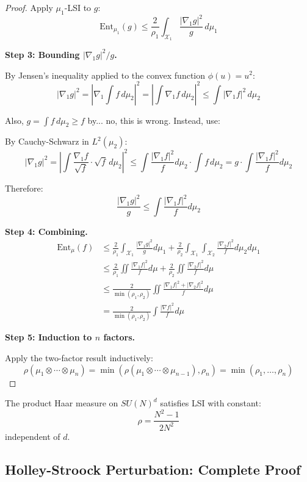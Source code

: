 \begin{proof}
Apply $\mu_1$-LSI to $g$:
\[
\text{Ent}_{\mu_1}(g) \leq \frac{2}{\rho_1} \int_{\mathcal{X}_1} \frac{|\nabla_1 g|^2}{g} \, d\mu_1
\]

\textbf{Step 3: Bounding $|\nabla_1 g|^2/g$.}

By Jensen's inequality applied to the convex function $\phi(u) = u^2$:
\[
|\nabla_1 g|^2 = \left|\nabla_1 \int f \, d\mu_2\right|^2 = \left|\int \nabla_1 f \, d\mu_2\right|^2 
\leq \int |\nabla_1 f|^2 \, d\mu_2
\]

Also, $g = \int f \, d\mu_2 \geq f$ by... no, this is wrong. Instead, use:

By Cauchy-Schwarz in $L^2(\mu_2)$:
\[
|\nabla_1 g|^2 = \left|\int \frac{\nabla_1 f}{\sqrt{f}} \cdot \sqrt{f} \, d\mu_2\right|^2 
\leq \int \frac{|\nabla_1 f|^2}{f} d\mu_2 \cdot \int f \, d\mu_2 = g \cdot \int \frac{|\nabla_1 f|^2}{f} d\mu_2
\]

Therefore:
\[
\frac{|\nabla_1 g|^2}{g} \leq \int \frac{|\nabla_1 f|^2}{f} d\mu_2
\]

\textbf{Step 4: Combining.}
\begin{align}
\text{Ent}_\mu(f) &\leq \frac{2}{\rho_1} \int_{\mathcal{X}_1} \frac{|\nabla_1 g|^2}{g} d\mu_1 
+ \frac{2}{\rho_2} \int_{\mathcal{X}_1} \int_{\mathcal{X}_2} \frac{|\nabla_2 f|^2}{f} d\mu_2 d\mu_1 \\
&\leq \frac{2}{\rho_1} \iint \frac{|\nabla_1 f|^2}{f} d\mu + \frac{2}{\rho_2} \iint \frac{|\nabla_2 f|^2}{f} d\mu \\
&\leq \frac{2}{\min(\rho_1, \rho_2)} \iint \frac{|\nabla_1 f|^2 + |\nabla_2 f|^2}{f} d\mu \\
&= \frac{2}{\min(\rho_1, \rho_2)} \int \frac{|\nabla f|^2}{f} d\mu
\end{align}

\textbf{Step 5: Induction to $n$ factors.}

Apply the two-factor result inductively:
\[
\rho(\mu_1 \otimes \cdots \otimes \mu_n) = \min(\rho(\mu_1 \otimes \cdots \otimes \mu_{n-1}), \rho_n) 
= \min(\rho_1, \ldots, \rho_n)
\]
\end{proof}

\begin{corollary}
\label{cor:lsi-sun-d}
The product Haar measure on $SU(N)^d$ satisfies LSI with constant:
\[
\rho = \frac{N^2-1}{2N^2}
\]
independent of $d$.
\end{corollary}

\subsection{Holley-Stroock Perturbation: Complete Proof}

